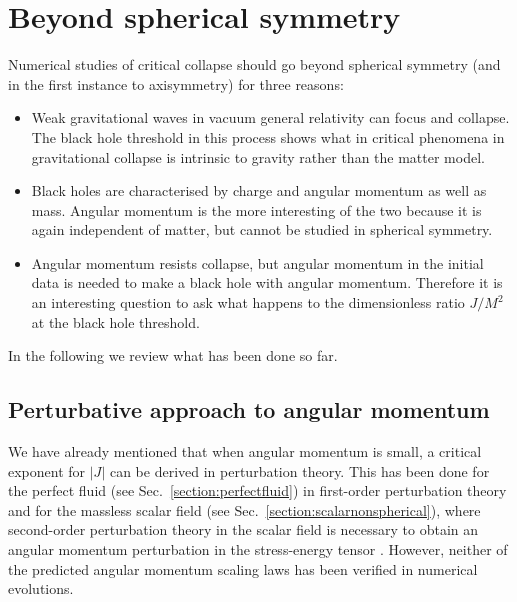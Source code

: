 \documentclass{article}
\begin{document}
\section{Beyond spherical symmetry}
\label{section:nonspherical}

Numerical studies of critical collapse should go beyond spherical
symmetry (and in the first instance to axisymmetry) for three reasons:

\begin{itemize}

\item Weak gravitational waves in vacuum general relativity can focus
and collapse. The black hole threshold in this process shows what in
critical phenomena in gravitational collapse is intrinsic to gravity
rather than the matter model. 

\item Black holes are characterised by charge and angular momentum as
well as mass. Angular momentum is the more interesting of the two
because it is again independent of matter, but cannot be studied in
spherical symmetry.

\item Angular momentum resists collapse, but angular momentum in the
initial data is needed to make a black hole with angular
momentum. Therefore it is an interesting question to ask what
happens to the dimensionless ratio $J/M^2$ at the black hole
threshold. 

\end{itemize}

In the following we review what has been done so far. 


\subsection{Perturbative approach to angular momentum}

We have already mentioned that when angular momentum is small, a
critical exponent for $|J|$ can be derived in perturbation
theory. This has been done for the perfect fluid (see
Sec.~\ref{section:perfectfluid}) in first-order perturbation theory
and for the massless scalar field (see
Sec.~\ref{section:scalarnonspherical}), where second-order
perturbation theory in the scalar field is necessary to obtain an
angular momentum perturbation in the stress-energy tensor
\cite{GarfinkleGundlachMartin}. However, neither of the predicted
angular momentum scaling laws has been verified in numerical
evolutions.
\end{document}
